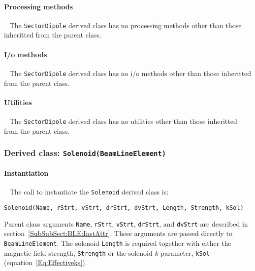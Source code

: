 \paragraph{Processing methods} ~\newline
\noindent
The \texttt{SectorDipole} derived class has no processing methods
other than those inheritted from the parent class.

\paragraph{I/o methods} ~\newline
\noindent
The \texttt{SectorDipole} derived class has no i/o methods other
than those inheritted from the parent class.

\paragraph{Utilities} ~\newline
\noindent
The \texttt{SectorDipole} derived class has no utilities other
than those inheritted from the parent class. 

\FloatBarrier

\subsubsection{Derived class: \texttt{Solenoid(BeamLineElement)}}

\paragraph{Instantiation} ~\newline
\noindent
The call to instantiate the \texttt{Solenoid} derived class is:
\begin{center}
  \texttt{Solenoid(Name, rStrt, vStrt, drStrt, dvStrt,
          Length, Strength, kSol)} 
\end{center}
Parent class arguments \texttt{Name}, \texttt{rStrt}, \texttt{vStrt},
\texttt{drStrt}, and \texttt{dvStrt} are described in
section~\ref{SubSubSect:BLE:InstAttr}.
These arguments are passed directly to \texttt{BeamLineElement}.
The solenoid \texttt{Length} is required together with either the
magnetic field strength, \texttt{Strength} or the solenoid $k$
parameter, \texttt{kSol} (equation~\ref{Eq:Effectiveks}).  

